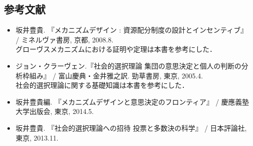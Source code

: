 \documentclass[a4paper, 11pt]{jsarticle}
\begin{document}
\subsection*{参考文献}
\begin{itemize}[leftmargin=*]
\item 坂井豊貴. 『メカニズムデザイン : 資源配分制度の設計とインセンティブ』 / ミネルヴァ書房, 京都, 2008.8.\\グローヴスメカニズムにおける証明や定理は本書を参考にした．
\item ジョン・クラーヴェン.『社会的選択理論 集団の意思決定と個人の判断の分析枠組み』 / 富山慶典・金井雅之訳. 勁草書房, 東京, 2005.4.\\社会的選択理論に関する基礎知識は本書を参考にした．
\item 坂井豊貴編. 『メカニズムデザインと意思決定のフロンティア』 / 慶應義塾大学出版会, 東京, 2014.5.
\item 坂井豊貴. 『社会的選択理論への招待 投票と多数決の科学』 / 日本評論社, 東京, 2013.11.
\end{itemize}
\end{document}

